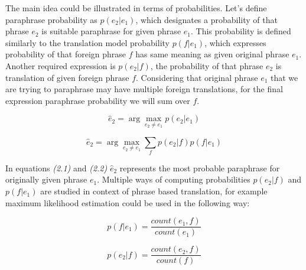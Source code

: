 The main idea could be illustrated in terms of probabilities. Let's define paraphrase probability as $p(e_{2} | e_{1})$, which designates a probability of that phrase $e_{2}$ is suitable paraphrase for given phrase $e_{1}$. This probability is defined similarly to the translation model probability $p(f | e_{1})$, which expresses probability of that foreign phrase $f$ has same meaning as given original phrase $e_{1}$. Another required expression is $p(e_{2} | f)$, the probability of that phrase $e_{2}$ is translation of given foreign phrase $f$. Considering that original phrase $e_{1}$ that we are trying to paraphrase may have multiple foreign translations, for the final expression paraphrase probability we will sum over $f$.

\begin{large}
\begin{equation}
\hat{e}_{2} = \arg\max_{e_{2} \neq e_{1}} p(e_{2} | e_{1})
\end{equation}
\end{large}

\begin{large}
\begin{equation}
\hat{e}_{2} = \arg\max_{e_{2} \neq e_{1}} \sum_{f}p(e_{2} | f)p(f | e_{1})
\end{equation}
\end{large}

\begin{center}
\textit{\cite{Callison-Burch2007}}
\end{center}

In equations \textit{(2.1)} and \textit{(2.2)} $\hat{e}_{2}$ represents the most probable paraphrase for originally given phrase $e_{1}$. Multiple ways of computing probabilities $p(e_{2} | f)$ and $p(f | e_{1})$ are studied in context of phrase based translation, for example maximum likelihood estimation could be used in the following way:

\begin{large}
\begin{equation}
p(f | e_{1}) = \frac{count(e_{1}, f)}{count(e_{1})} 
\end{equation}
\end{large}

\begin{large}
\begin{equation}
p(e_{2} | f) = \frac{count(e_{2}, f)}{count(f)}
\end{equation}
\end{large} 

